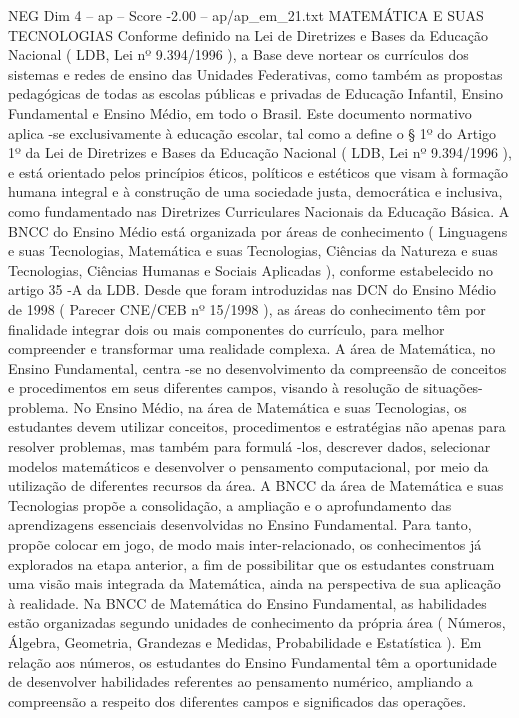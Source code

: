 \begin{textsample}{NEG Dim 4 – ap – Score -2.00 – ap/ap\_em\_21.txt}  \label{ex:f4_neg_057}
MATEMÁTICA E SUAS TECNOLOGIAS Conforme definido na Lei de Diretrizes e Bases da Educação Nacional ( LDB, Lei nº 9.394/1996 ), a Base deve nortear os currículos dos sistemas e redes de ensino das Unidades Federativas, como também as propostas pedagógicas de todas as escolas públicas e privadas de Educação Infantil, Ensino Fundamental e Ensino Médio, em todo o Brasil.
Este documento normativo aplica -se exclusivamente à educação escolar, tal como a define o § 1º do Artigo 1º da Lei de Diretrizes e Bases da Educação Nacional ( LDB, Lei nº 9.394/1996 ), e está orientado pelos princípios éticos, políticos e estéticos que visam à formação humana integral e à construção de uma sociedade justa, democrática e inclusiva, como fundamentado nas Diretrizes Curriculares Nacionais da Educação Básica.
A BNCC do Ensino Médio está organizada por áreas de conhecimento ( Linguagens e suas Tecnologias, Matemática e suas Tecnologias, Ciências da Natureza e suas Tecnologias, Ciências Humanas e Sociais Aplicadas ), conforme estabelecido no artigo 35 -A da LDB.
Desde que foram introduzidas nas DCN do Ensino Médio de 1998 ( Parecer CNE/CEB nº 15/1998 ), as áreas do conhecimento têm por finalidade integrar dois ou mais componentes do currículo, para melhor compreender e transformar uma realidade complexa.
A área de Matemática, no Ensino Fundamental, centra -se no desenvolvimento da compreensão de conceitos e procedimentos em seus diferentes campos, visando à resolução de situações-problema.
No Ensino Médio, na área de Matemática e suas Tecnologias, os estudantes devem utilizar conceitos, procedimentos e estratégias não apenas para resolver problemas, mas também para formulá -los, descrever dados, selecionar modelos matemáticos e desenvolver o pensamento computacional, por meio da utilização de diferentes recursos da área.
A BNCC da área de Matemática e suas Tecnologias propõe a consolidação, a ampliação e o aprofundamento das aprendizagens essenciais desenvolvidas no Ensino Fundamental.
Para tanto, propõe colocar em jogo, de modo mais inter-relacionado, os conhecimentos já explorados na etapa anterior, a fim de possibilitar que os estudantes construam uma visão mais integrada da Matemática, ainda na perspectiva de sua aplicação à realidade.
Na BNCC de Matemática do Ensino Fundamental, as habilidades estão organizadas segundo unidades de conhecimento da própria área ( Números, Álgebra, Geometria, Grandezas e Medidas, Probabilidade e Estatística ).
Em relação aos números, os estudantes do Ensino Fundamental têm a oportunidade de desenvolver habilidades referentes ao pensamento numérico, ampliando a compreensão a respeito dos diferentes campos e significados das operações.

\end{textsample}
